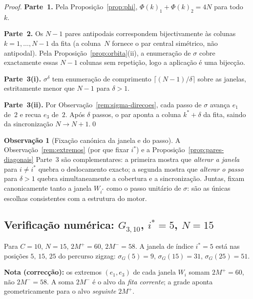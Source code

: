 \documentclass[12pt, a4paper]{article}
\theoremstyle{plain}
\theoremstyle{definition}
\newtheorem{remark}[theorem]{Observação}
\theoremstyle{remark}
\begin{document}
	\begin{proof}
		\textbf{Parte~1.}  Pela Proposição~\ref{prop:phi},
		$\Phi(k)_1+\Phi(k)_2=4N$ para todo~$k$.\checkmark
		
		\textbf{Parte~2.}  Os $N-1$ pares antipodais correspondem
		bijectivamente às colunas $k=1,\ldots,N-1$ da fita (a
		coluna~$N$ fornece o par central simétrico, não antipodal).  Pela
		Proposição~\ref{prop:orbita}(ii), a enumeração de $\sigma$ cobre
		exactamente essas $N-1$ colunas sem repetição, logo a aplicação
		é uma bijecção.\checkmark
		
		\textbf{Parte~3(i).}  $\sigma^\delta$ tem enumeração de comprimento
		$\lceil(N-1)/\delta\rceil$ sobre as janelas, estritamente menor
		que $N-1$ para $\delta>1$.
		
		\textbf{Parte~3(ii).}  Por
		Observação~\ref{rem:sigma-direcoes}, cada passo de $\sigma$
		avança $e_1$ de~$2$ e recua $e_3$ de~$2$.  Após $\delta$ passos,
		o par aponta a coluna $k^*+\delta$ da fita, saindo da
		sincronização $N\to N{+}1$.\qed
	\end{proof}
	
	\begin{remark}[Fixação canónica da janela e do passo]
		\label{rem:canonico}
		A Observação~\ref{rem:extremos} (por que fixar $i^*$) e a
		Proposição~\ref{prop:pares-diagonais} Parte~3 são complementares:
		a primeira mostra que \emph{alterar a janela} para $i\neq i^*$
		quebra o deslocamento exacto; a segunda mostra que \emph{alterar
			o passo} para $\delta>1$ quebra simultaneamente a cobertura e a
		sincronização.  Juntas, fixam canonicamente tanto a janela
		$W_{i^*}$ como o passo unitário de $\sigma$: são as únicas
		escolhas consistentes com a estrutura do motor.
	\end{remark}
	
	\subsection{Verificação numérica: $G_{3,10}$, $i^*=5$, $N=15$}
	\label{subsec:verif-sigma}
	
	Para $C=10$, $N=15$, $2M^+=60$, $2M^-=58$.
	A janela de índice $i^*=5$ está nas posições $5,\,15,\,25$ do
	percurso zigzag: $\sigma_G(5)=9$, $\sigma_G(15)=31$, $\sigma_G(25)=51$.
	
	\textbf{Nota (correcção):} os extremos $(e_1, e_3)$ de cada janela
	$W_i$ somam $2M^+ = 60$, não $2M^-=58$.  A soma $2M^-$ é o alvo
	da \emph{fita corrente}; a grade aponta geometricamente para o
	alvo \emph{seguinte} $2M^+$.
	
\end{document}
